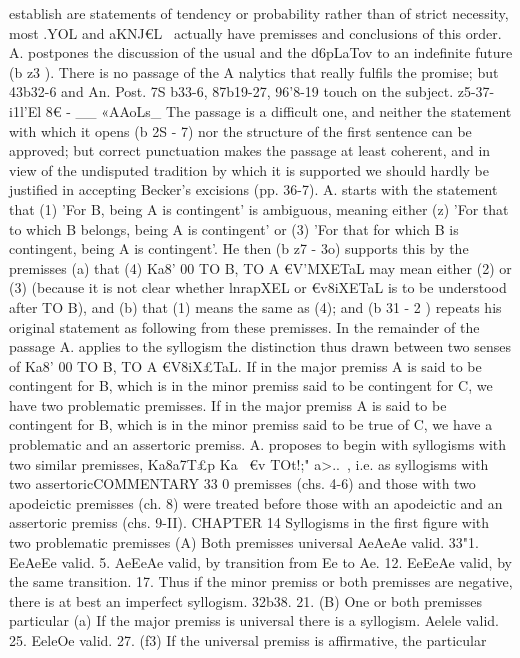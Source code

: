 {{{{{establish are statements of tendency or probability rather than
of strict necessity, most .\6YOL and aKNJ€L~ actually have premisses
and conclusions of this order.
A. postpones the discussion of the usual and the d6pLaTov to
an indefinite future (b z3 ). There is no passage of the A nalytics
that really fulfils the promise; but 43b32-6 and An. Post. 7S b33-6,
87b19-27, 96'8-19 touch on the subject.
z5-37- i1l'El 8€ - __ «AAoLs_ The passage is a difficult one, and
neither the statement with which it opens (b 2S - 7) nor the structure
of the first sentence can be approved; but correct punctuation
makes the passage at least coherent, and in view of the undisputed
tradition by which it is supported we should hardly be justified
in accepting Becker's excisions (pp. 36-7). A. starts with the
statement that (1) 'For B, being A is contingent' is ambiguous,
meaning either (z) 'For that to which B belongs, being A is
contingent' or (3) 'For that for which B is contingent, being A
is contingent'. He then (b z7 - 3o) supports this by the premisses
(a) that (4) Ka8' 00 TO B, TO A €V'MXETaL may mean either (2) or
(3) (because it is not clear whether lnrapXEL or €v8iXETaL is to be
understood after TO B), and (b) that (1) means the same as (4);
and (b 31 - 2 ) repeats his original statement as following from
these premisses.
In the remainder of the passage A. applies to the syllogism the
distinction thus drawn between two senses of Ka8' 00 TO B, TO
A €V8iX£TaL. If in the major premiss A is said to be contingent
for B, which is in the minor premiss said to be contingent for C,
we have two problematic premisses. If in the major premiss A
is said to be contingent for B, which is in the minor premiss said
to be true of C, we have a problematic and an assertoric premiss.
A. proposes to begin with syllogisms with two similar premisses,
Ka8a7T£p Ka~ €v TOt!;" a>..\OL~, i.e. as syllogisms with two assertoricCOMMENTARY
33 0
premisses (chs. 4-6) and those with two apodeictic premisses
(ch. 8) were treated before those with an apodeictic and an
assertoric premiss (chs. 9-II).
CHAPTER 14
Syllogisms in the first figure with two problematic premisses
(A) Both premisses universal
AeAeAe valid.
33"1. EeAeEe valid.
5. AeEeAe valid, by transition from Ee to Ae.
12. EeEeAe valid, by the same transition.
17. Thus if the minor premiss or both premisses are negative,
there is at best an imperfect syllogism.
32b38.
21.
(B) One or both premisses particular
(a) If the major premiss is universal there is a syllogism.
Aelele valid.
25. EeleOe valid.
27. (f3) If the universal premiss is affirmative, the particular
}}}}}
